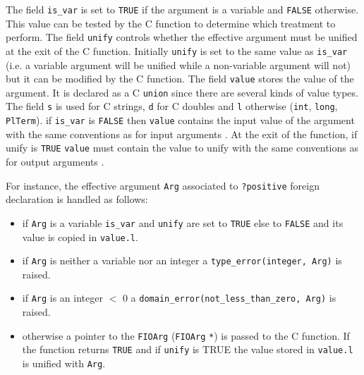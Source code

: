 The field \texttt{is\_var} is set to \texttt{TRUE} if the argument is a
variable and \texttt{FALSE} otherwise. This value can be tested by the C
function to determine which treatment to perform. The field \texttt{unify}
controls whether the effective argument must be unified at the exit of the C
function. Initially \texttt{unify} is set to the same value as
\texttt{is\_var} (i.e. a variable argument will be unified while a
non-variable argument will not) but it can be modified by the C function.
The field \texttt{value} stores the value of the argument. It is declared as
a C \texttt{union} since there are several kinds of value types. The field
\texttt{s} is used for C strings, \texttt{d} for C doubles and \texttt{l}
otherwise (\texttt{int}, \texttt{long}, \texttt{PlTerm}). if \texttt{is\_var}
is \texttt{FALSE} then \texttt{value} contains the input value of the
argument with the same conventions as for input arguments
.  At the exit of the function, if unify is
\texttt{TRUE} \texttt{value} must contain the value to unify with the same
conventions as for output arguments
.

For instance, the effective argument \texttt{Arg} associated to
\texttt{?positive} foreign declaration is handled as follows:

\begin{itemize}

\item if \texttt{Arg} is a variable \texttt{is\_var} and \texttt{unify} are
set to \texttt{TRUE} else to \texttt{FALSE} and its value is copied in
\texttt{value.l}.

\item if \texttt{Arg} is neither a variable nor an integer a
\texttt{type\_error(integer, Arg)} is raised.

\item if \texttt{Arg} is an integer $<$ 0 a
\texttt{domain\_error(not\_less\_than\_zero, Arg)} is raised.

\item otherwise a pointer to the \texttt{FIOArg} (\texttt{FIOArg}
\texttt{*}) is passed to the C function. If the function returns
\texttt{TRUE} and if \texttt{unify} is TRUE the value stored in
\texttt{value.l} is unified with \texttt{Arg}.

\end{itemize}

